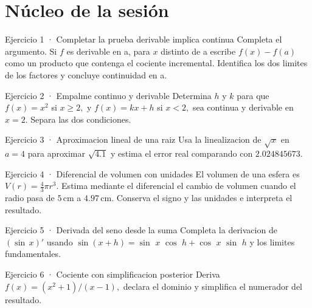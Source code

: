 \documentclass[10pt,a4paper,oneside,openany]{book}
\begin{document}
\section*{Núcleo de la sesión}
\begin{PSevenExerciseFixed}{Ejercicio 1 · Completar la prueba derivable implica continua}
Completa el argumento. Si \(f\) es derivable en a, para \(x\) distinto de a escribe \(f(x)-f(a)\) como un producto que contenga el cociente incremental. Identifica los dos limites de los factores y concluye continuidad en a.
\end{PSevenExerciseFixed}
\begin{PSevenExerciseFixed}{Ejercicio 2 · Empalme continuo y derivable}
Determina \(h\) y \(k\) para que \(f(x)=x^{2}\) si \(x\ge 2,\) y \(f(x)=kx+h\) si \(x<2,\) sea continua y derivable en \(x=2\). Separa las dos condiciones.
\end{PSevenExerciseFixed}
\begin{PSevenExerciseFixed}{Ejercicio 3 · Aproximacion lineal de una raiz}
Usa la linealizacion de \(\sqrt{x}\) en \(a=4\) para aproximar \(\sqrt{4.1}\) y estima el error real comparando con \(2.024845673\).
\end{PSevenExerciseFixed}
\begin{PSevenExerciseFixed}{Ejercicio 4 · Diferencial de volumen con unidades}
El volumen de una esfera es \(V(r)=\tfrac43\pi r^3\). Estima mediante el diferencial el cambio de volumen cuando el radio pasa de \(5\,\mathrm{cm}\) a \(4.97\,\mathrm{cm}\). Conserva el signo y las unidades e interpreta el resultado.
\end{PSevenExerciseFixed}
\begin{PSevenExerciseFixed}{Ejercicio 5 · Derivada del seno desde la suma}
Completa la derivacion de \((\sin\,x)'\) usando \(\sin(x+h)=\sin\) \(x\) \(\cos\) \(h+\cos\) \(x\) \(\sin\) \(h\) y los limites fundamentales.
\end{PSevenExerciseFixed}
\begin{PSevenExerciseFixed}{Ejercicio 6 · Cociente con simplificacion posterior}
Deriva \(f(x)=(x^{2}+1)/(x-1),\) declara el dominio y simplifica el numerador del resultado.
\end{PSevenExerciseFixed}
\end{document}
